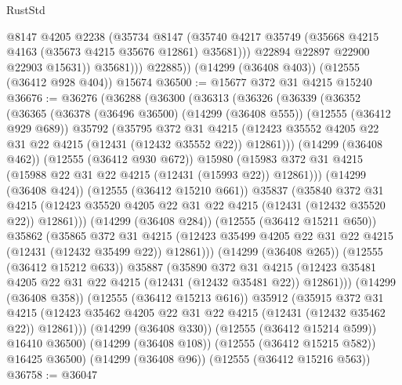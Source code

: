 \begin{lexlean}{RustStd}
\begin{coremodule}
                  @8147
                  @4205
                  @2238
                  (@35734
                    @8147
                    (@35740 @4217 @35749 (@35668 @4215 @4163 (@35673 @4215 @35676 @12861) @35681)))
                  @22894
                  @22897
                  @22900
                  @22903
                  @15631))
              @35681)))
        @22885))
    (@14299 (@36408 @403))
    (@12555 (@36412 @928 @404))
    @15674
@36500 := @15677 @372 @31 @4215 @15240
@36676 := @36276
    (@36288
      (@36300
        (@36313
          (@36326
            (@36339
              (@36352
                (@36365
                  (@36378
                    (@36496 @36500)
                    (@14299 (@36408 @555))
                    (@12555 (@36412 @929 @689))
                    @35792
                    (@35795
                      @372
                      @31
                      @4215
                      (@12423 @35552 @4205 @22 @31 @22 @4215 (@12431 (@12432 @35552 @22)) @12861)))
                  (@14299 (@36408 @462))
                  (@12555 (@36412 @930 @672))
                  @15980
                  (@15983 @372 @31 @4215 (@15988 @22 @31 @22 @4215 (@12431 (@15993 @22)) @12861)))
                (@14299 (@36408 @424))
                (@12555 (@36412 @15210 @661))
                @35837
                (@35840
                  @372
                  @31
                  @4215
                  (@12423 @35520 @4205 @22 @31 @22 @4215 (@12431 (@12432 @35520 @22)) @12861)))
              (@14299 (@36408 @284))
              (@12555 (@36412 @15211 @650))
              @35862
              (@35865
                @372
                @31
                @4215
                (@12423 @35499 @4205 @22 @31 @22 @4215 (@12431 (@12432 @35499 @22)) @12861)))
            (@14299 (@36408 @265))
            (@12555 (@36412 @15212 @633))
            @35887
            (@35890
              @372
              @31
              @4215
              (@12423 @35481 @4205 @22 @31 @22 @4215 (@12431 (@12432 @35481 @22)) @12861)))
          (@14299 (@36408 @358))
          (@12555 (@36412 @15213 @616))
          @35912
          (@35915
            @372
            @31
            @4215
            (@12423 @35462 @4205 @22 @31 @22 @4215 (@12431 (@12432 @35462 @22)) @12861)))
        (@14299 (@36408 @330))
        (@12555 (@36412 @15214 @599))
        @16410
        @36500)
      (@14299 (@36408 @108))
      (@12555 (@36412 @15215 @582))
      @16425
      @36500)
    (@14299 (@36408 @96))
    (@12555 (@36412 @15216 @563))
@36758 := @36047

\end{coremodule}
\end{lexlean}
